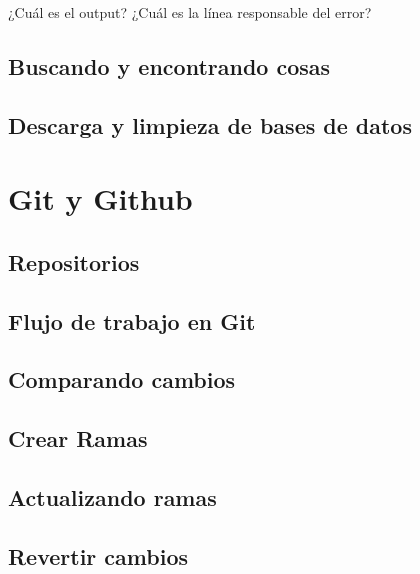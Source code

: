 \documentclass[
]{book}
\begin{document}
¿Cuál es el output? ¿Cuál es la línea responsable del error?

\hypertarget{buscando-y-encontrando-cosas}{%
\section{Buscando y encontrando cosas}\label{buscando-y-encontrando-cosas}}

\hypertarget{descarga-y-limpieza-de-bases-de-datos}{%
\section{Descarga y limpieza de bases de datos}\label{descarga-y-limpieza-de-bases-de-datos}}

\hypertarget{git-y-github}{%
\chapter{Git y Github}\label{git-y-github}}

\hypertarget{repositorios}{%
\section{Repositorios}\label{repositorios}}

\hypertarget{flujo-de-trabajo-en-git}{%
\section{Flujo de trabajo en Git}\label{flujo-de-trabajo-en-git}}

\hypertarget{comparando-cambios}{%
\section{Comparando cambios}\label{comparando-cambios}}

\hypertarget{crear-ramas}{%
\section{Crear Ramas}\label{crear-ramas}}

\hypertarget{actualizando-ramas}{%
\section{Actualizando ramas}\label{actualizando-ramas}}

\hypertarget{revertir-cambios}{%
\section{Revertir cambios}\label{revertir-cambios}}
\end{document}
